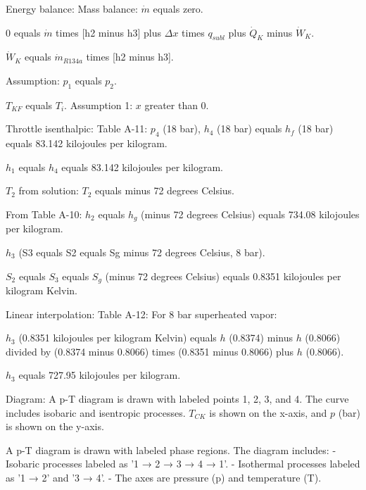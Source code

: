 Energy balance:  
Mass balance: \( \dot{m} \) equals zero.  

0 equals \( \dot{m} \) times [h2 minus h3] plus \( \Delta x \) times \( q_{subl} \) plus \( \dot{Q}_K \) minus \( \dot{W}_K \).  

\( \dot{W}_K \) equals \( \dot{m}_{R134a} \) times [h2 minus h3].  

Assumption: \( p_1 \) equals \( p_2 \).  

\( T_{KF} \) equals \( T_i \). Assumption 1: \( x \) greater than 0.  

Throttle isenthalpic:  
Table A-11:  
\( p_4 \) (18 bar), \( h_4 \) (18 bar) equals \( h_f \) (18 bar) equals 83.142 kilojoules per kilogram.  

\( h_1 \) equals \( h_4 \) equals 83.142 kilojoules per kilogram.  

\( T_2 \) from solution:  
\( T_2 \) equals minus 72 degrees Celsius.  

From Table A-10:  
\( h_2 \) equals \( h_g \) (minus 72 degrees Celsius) equals 734.08 kilojoules per kilogram.  

\( h_3 \) (S3 equals S2 equals Sg minus 72 degrees Celsius, 8 bar).  

\( S_2 \) equals \( S_3 \) equals \( S_g \) (minus 72 degrees Celsius) equals 0.8351 kilojoules per kilogram Kelvin.  

Linear interpolation: Table A-12:  
For 8 bar superheated vapor:  

\( h_3 \) (0.8351 kilojoules per kilogram Kelvin) equals \( h \) (0.8374) minus \( h \) (0.8066) divided by (0.8374 minus 0.8066) times (0.8351 minus 0.8066) plus \( h \) (0.8066).  

\( h_3 \) equals 727.95 kilojoules per kilogram.  

Diagram:  
A p-T diagram is drawn with labeled points 1, 2, 3, and 4. The curve includes isobaric and isentropic processes. \( T_{CK} \) is shown on the x-axis, and \( p \) (bar) is shown on the y-axis.

A p-T diagram is drawn with labeled phase regions. The diagram includes:  
- Isobaric processes labeled as '1 → 2 → 3 → 4 → 1'.  
- Isothermal processes labeled as '1 → 2' and '3 → 4'.  
- The axes are pressure (p) and temperature (T).